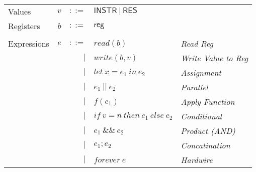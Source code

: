 \documentclass[12pt, letterpaper]{article}
\begin{document}
  \begin{tabular}{l r r l l}
    Values        & $v$     & $::=$     & $\mathsf{INSTR\ |\ RES}$ &\\
    Registers     & $b$     & $::=$     & $\mathsf{reg}$           &\\
    \\
    Expressions & $e$ & $::=$  & $read(b)$       
                      & \textit{Read Reg}\\
                &     & $\mid$ & $write(b,v)$    
                      & \textit{Write Value to Reg}\\
                &     & $\mid$ & $let\ x = e_1\ in\ e_2$ 
                      & \textit{Assignment}\\  
                &     & $\mid$ & $e_1\ ||\ e_2$ 
                      & \textit{Parallel}\\
                &     & $\mid$ & $f(e_1)$        
                      & \textit{Apply Function} \\  
                &     & $\mid$ & $if\ v = n\ then\ e_1\ else\ e_2$
                      & \textit{Conditional} \\
                &     & $\mid$ & $e_1\ \&\&\ e_2$ 
                      & \textit{Product (AND)}\\
                &     & $\mid$ & $e_1 ; e_2$
                      & \textit{Concatination}\\
                &     & $\mid$ & $forever\ e$ 
                      & \textit{Hardwire}
  \end{tabular}


\end{document}

